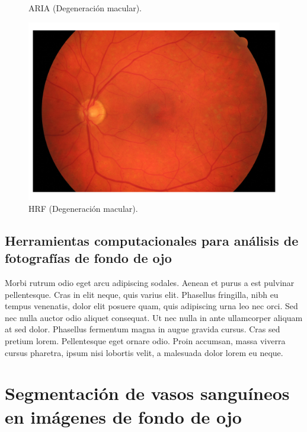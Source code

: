 \begin{figure}[h]
	\caption[ARIA]{ARIA (Degeneración macular).}\label{fig:ARIA}
\endminipage\hfill
{}
	\includegraphics[width=\linewidth]{Figures/images2}
	\caption[HRF]{HRF (Degeneración macular).}\label{fig:HRF}
\endminipage\hfill

\end{figure}



\subsection{Herramientas computacionales para an\'alisis de fotograf\'ias de fondo de ojo}
Morbi rutrum odio eget arcu adipiscing sodales. Aenean et purus a est pulvinar pellentesque. Cras in elit neque, quis varius elit. Phasellus fringilla, nibh eu tempus venenatis, dolor elit posuere quam, quis adipiscing urna leo nec orci. Sed nec nulla auctor odio aliquet consequat. Ut nec nulla in ante ullamcorper aliquam at sed dolor. Phasellus fermentum magna in augue gravida cursus. Cras sed pretium lorem. Pellentesque eget ornare odio. Proin accumsan, massa viverra cursus pharetra, ipsum nisi lobortis velit, a malesuada dolor lorem eu neque.


\section{Segmentaci\'on de vasos sangu\'ineos en im\'agenes de fondo de ojo}

